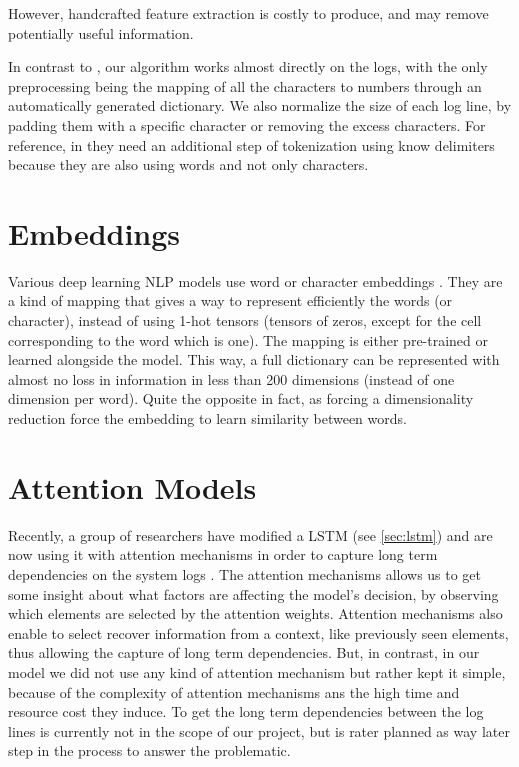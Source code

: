 However, handcrafted feature extraction is costly to produce, and may remove potentially useful information.

In contrast to \cite{lstm_cluster}, our algorithm works almost directly on the logs, with the only preprocessing being the mapping of all the characters to numbers through an automatically generated dictionary.
We also normalize the size of each log line, by padding them with a specific character or removing the excess characters.
For reference, in \cite{rnn_attention_lanl} they need an additional step of tokenization using know delimiters because they are also using words and not only characters.

\section{Embeddings}
Various deep learning NLP models use word or character embeddings \cite{pooling_simple,deep_learning_book}. They are a kind of mapping that gives a way to represent efficiently the words (or character), instead of using 1-hot tensors (tensors of zeros, except for the cell corresponding to the word which is one). The mapping is either pre-trained or learned alongside the model. This way, a full dictionary can be represented with almost no loss in information in less than 200 dimensions (instead of one dimension per word). Quite the opposite in fact, as forcing a dimensionality reduction force the embedding to learn similarity between words.

\section{Attention Models}
Recently, a group of researchers have modified a LSTM (see \autoref{sec:lstm}) and are now using it with attention mechanisms in order to capture long term dependencies on the system logs \cite{rnn_attention_lanl}.
The attention mechanisms allows us to get some insight about what factors are affecting the model’s decision, by observing which elements are selected by the attention weights. Attention mechanisms also enable to select recover information from a context, like previously seen elements, thus allowing the capture of long term dependencies.
But, in contrast, in our model we did not use any kind of attention mechanism but rather kept it simple, because of the complexity of attention mechanisms ans the high time and resource cost they induce. To get the long term dependencies between the log lines is currently not in the scope of our project, but is rater planned as way later step in the process to answer the problematic.

